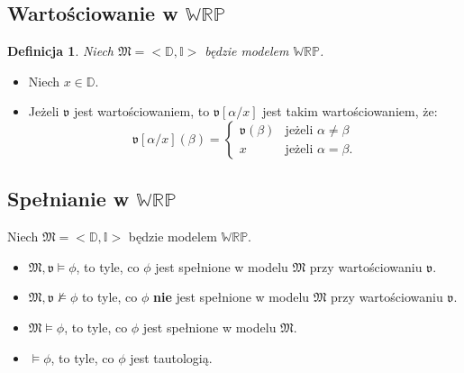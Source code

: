 \documentclass[12pt]{article}
\newtheorem{definicja}{Definicja}
\newcommand {\WRP} {\ensuremath{\mathbb{WRP}}}
\begin{document}
\subsection{Wartościowanie w \WRP}
%
\begin{definicja}
Niech $\mathfrak{M}=<\mathbb{D}, \mathbb{I}>$ będzie modelem \WRP. %
\end{definicja}
%
\begin{itemize}
\item Niech $x \in \mathbb{D}$.
%
\item Jeżeli $\mathfrak{v}$ jest wartościowaniem, to $\mathfrak{v}[\alpha/x]$ jest takim wartościowaniem, że:
%
\begin{equation}
\mathfrak{v}[\alpha/x](\beta)= \left\{
\begin{array}{rl}
\mathfrak{v}(\beta) & \text{jeżeli } \alpha \ne \beta \\
x & \text{jeżeli } \alpha = \beta.
\end{array} \right.
\end{equation}
\end{itemize}
%



\subsection{Spełnianie w \WRP}
%
Niech $\mathfrak{M}=<\mathbb{D}, \mathbb{I}>$ będzie modelem \WRP.\\
%
\begin{itemize}
\item $\mathfrak{M},\mathfrak{v} \vDash \phi$, to tyle, co $\phi$ jest spełnione w modelu $\mathfrak{M}$ przy wartościowaniu $\mathfrak{v}$.
%
\item $\mathfrak{M},\mathfrak{v}  \nvDash \phi$ to tyle, co $\phi$ \textbf{nie} jest spełnione w modelu $\mathfrak{M}$ przy wartościowaniu $\mathfrak{v}$.
%
\item $\mathfrak{M} \vDash \phi$, to tyle, co $\phi$ jest spełnione w modelu $\mathfrak{M}$.
%
\item $\vDash \phi$, to tyle, co $\phi$ jest tautologią.
\end{itemize}
%
\end{document}
